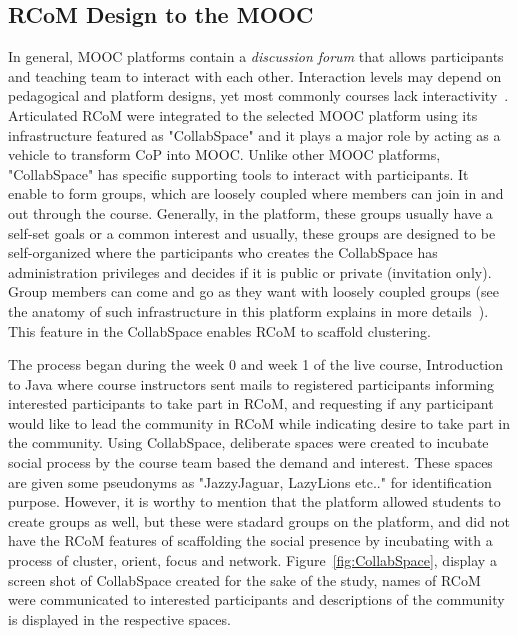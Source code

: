 \documentclass[format=acmsmall, review=false, screen=true]{acmart}
\begin{document}
\subsection{RCoM Design to the MOOC}
In general, MOOC platforms contain a \textit{discussion forum} that allows participants and teaching team to interact with each other. Interaction levels may depend on pedagogical and platform designs, yet most commonly courses lack interactivity~\cite{gamage2020moocs}. Articulated RCoM were integrated to the selected MOOC platform using its infrastructure featured as "CollabSpace" and it plays a major role by acting as a vehicle to transform CoP into MOOC. Unlike other MOOC platforms, "CollabSpace" has specific supporting tools to interact with participants. It enable to form groups, which are loosely coupled where members can join in and out through the course. Generally, in the platform, these groups usually have a self-set goals or a common interest and usually, these groups are designed to be self-organized where the participants who creates the CollabSpace has administration privileges and decides if it is public or private (invitation only). Group members can come and go as they want with loosely coupled groups (see the anatomy of such infrastructure in this platform explains in more details~\cite{staubitz2014supporting,staubitz2017collaboration}). This feature in the CollabSpace enables RCoM to scaffold clustering. 

The process began during the week 0 and week 1 of the live course, Introduction to Java where course instructors sent mails to registered participants informing interested participants to take part in RCoM, and requesting if any participant would like to lead the community in RCoM while indicating desire to take part in the community. Using CollabSpace, deliberate spaces were created to incubate social process by the course team based the demand and interest. These spaces are given some pseudonyms as "JazzyJaguar, LazyLions etc.." for identification purpose. However, it is worthy to mention that the platform allowed students to create groups as well, but these were stadard groups on the platform, and did not have the RCoM features of scaffolding the social presence by incubating with a process of cluster, orient, focus and network. Figure~\ref{fig:CollabSpace}, display a screen shot of CollabSpace created for the sake of the study, names of RCoM were communicated to interested participants and descriptions of the community is displayed in the respective spaces. 
\end{document}
